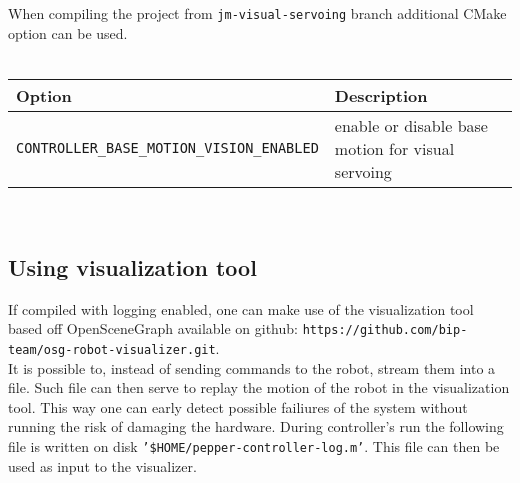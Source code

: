 \noindent When compiling the project from \texttt{jm-visual-servoing} branch additional CMake option can be used. \\ \\
\begin{tabular}{|l|p{5cm}|}
\hline
Option & Description \\
\hline
\texttt{CONTROLLER\_BASE\_MOTION\_VISION\_ENABLED} & enable or disable base motion for visual servoing \\
\hline
\end{tabular} \\

\subsection{Using visualization tool}
\noindent If compiled with logging enabled, one can make use of the visualization tool based off OpenSceneGraph
available on github: \texttt{https://github.com/bip-team/osg-robot-visualizer.git}. \\
\noindent It is possible to, instead of sending commands to the robot, stream them into a file. Such file can then serve
to replay the motion of the robot in the visualization tool. This way one can early detect possible failiures of the
system without running the risk of damaging the hardware. During controller's run the following file is written
on disk \texttt{'\$HOME/pepper-controller-log.m'}. This file can then be used as input to the visualizer.

